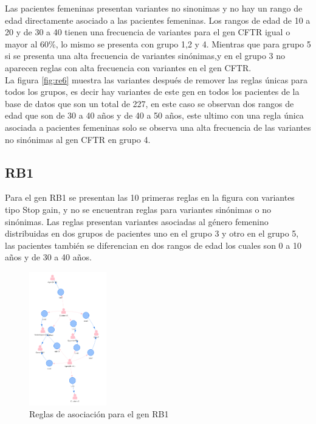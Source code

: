 Las pacientes femeninas presentan variantes no sinonimas y no hay un  rango de edad directamente asociado a las pacientes femeninas. Los rangos de edad de 10 a 20 y de 30 a 40 tienen una frecuencia de variantes para el gen CFTR igual o mayor al 60\%, lo mismo se presenta con grupo 1,2 y 4. Mientras que para grupo 5 si se presenta una alta frecuencia de variantes sinónimas,y en el grupo 3 no aparecen reglas con alta frecuencia con variantes en el gen CFTR. \\

La figura \ref{fig:re6} muestra las variantes después de remover las  reglas únicas para todos los grupos, es decir hay variantes de este gen en todos los pacientes de la base de datos que son un total de 227, en este caso se observan dos rangos de edad que son de 30 a 40 años y de 40 a 50 años, este ultimo con una regla única asociada a pacientes femeninas   \label{fig:r6} solo se observa una alta frecuencia de las variantes no sinónimas al gen CFTR en grupo 4.  

\subsection*{RB1}

Para el gen RB1 se presentan las 10 primeras reglas en la figura \label{fig:re7} con variantes tipo Stop gain, y no se encuentran reglas para variantes sinónimas o no sinónimas. Las reglas presentan variantes asociadas al género femenino distribuidas en dos grupos de pacientes uno en el grupo 3 y otro en el grupo 5, las pacientes también se diferencian en dos rangos de edad los cuales son 0 a 10 años y de 30 a 40 años. 

\begin{figure}[h]
	\centering
	\includegraphics[width=0.3\textwidth]{Kap4/RB1}
	\caption{Reglas de asociación para el gen RB1} \label{fig:re7}
\end{figure}

